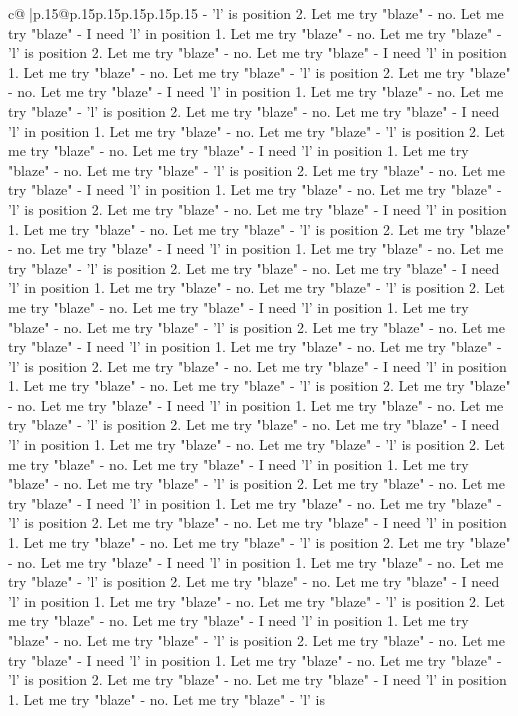 \documentclass{article}
\begin{document}
{\begin{supertabular}{c@{$\;$}|p{.15\linewidth}@{}p{.15\linewidth}p{.15\linewidth}p{.15\linewidth}p{.15\linewidth}p{.15\linewidth}}
{{{{-} 'l' is position 2. Let me try "blaze" {-} no. Let me try "blaze" {-} I need 'l' in position 1. Let me try "blaze" {-} no. Let me try "blaze" {-} 'l' is position 2. Let me try "blaze" {-} no. Let me try "blaze" {-} I need 'l' in position 1. Let me try "blaze" {-} no. Let me try "blaze" {-} 'l' is position 2. Let me try "blaze" {-} no. Let me try "blaze" {-} I need 'l' in position 1. Let me try "blaze" {-} no. Let me try "blaze" {-} 'l' is position 2. Let me try "blaze" {-} no. Let me try "blaze" {-} I need 'l' in position 1. Let me try "blaze" {-} no. Let me try "blaze" {-} 'l' is position 2. Let me try "blaze" {-} no. Let me try "blaze" {-} I need 'l' in position 1. Let me try "blaze" {-} no. Let me try "blaze" {-} 'l' is position 2. Let me try "blaze" {-} no. Let me try "blaze" {-} I need 'l' in position 1. Let me try "blaze" {-} no. Let me try "blaze" {-} 'l' is position 2. Let me try "blaze" {-} no. Let me try "blaze" {-} I need 'l' in position 1. Let me try "blaze" {-} no. Let me try "blaze" {-} 'l' is position 2. Let me try "blaze" {-} no. Let me try "blaze" {-} I need 'l' in position 1. Let me try "blaze" {-} no. Let me try "blaze" {-} 'l' is position 2. Let me try "blaze" {-} no. Let me try "blaze" {-} I need 'l' in position 1. Let me try "blaze" {-} no. Let me try "blaze" {-} 'l' is position 2. Let me try "blaze" {-} no. Let me try "blaze" {-} I need 'l' in position 1. Let me try "blaze" {-} no. Let me try "blaze" {-} 'l' is position 2. Let me try "blaze" {-} no. Let me try "blaze" {-} I need 'l' in position 1. Let me try "blaze" {-} no. Let me try "blaze" {-} 'l' is position 2. Let me try "blaze" {-} no. Let me try "blaze" {-} I need 'l' in position 1. Let me try "blaze" {-} no. Let me try "blaze" {-} 'l' is position 2. Let me try "blaze" {-} no. Let me try "blaze" {-} I need 'l' in position 1. Let me try "blaze" {-} no. Let me try "blaze" {-} 'l' is position 2. Let me try "blaze" {-} no. Let me try "blaze" {-} I need 'l' in position 1. Let me try "blaze" {-} no. Let me try "blaze" {-} 'l' is position 2. Let me try "blaze" {-} no. Let me try "blaze" {-} I need 'l' in position 1. Let me try "blaze" {-} no. Let me try "blaze" {-} 'l' is position 2. Let me try "blaze" {-} no. Let me try "blaze" {-} I need 'l' in position 1. Let me try "blaze" {-} no. Let me try "blaze" {-} 'l' is position 2. Let me try "blaze" {-} no. Let me try "blaze" {-} I need 'l' in position 1. Let me try "blaze" {-} no. Let me try "blaze" {-} 'l' is position 2. Let me try "blaze" {-} no. Let me try "blaze" {-} I need 'l' in position 1. Let me try "blaze" {-} no. Let me try "blaze" {-} 'l' is position 2. Let me try "blaze" {-} no. Let me try "blaze" {-} I need 'l' in position 1. Let me try "blaze" {-} no. Let me try "blaze" {-} 'l' is position 2. Let me try "blaze" {-} no. Let me try "blaze" {-} I need 'l' in position 1. Let me try "blaze" {-} no. Let me try "blaze" {-} 'l' is position 2. Let me try "blaze" {-} no. Let me try "blaze" {-} I need 'l' in position 1. Let me try "blaze" {-} no. Let me try "blaze" {-} 'l' is position 2. Let me try "blaze" {-} no. Let me try "blaze" {-} I need 'l' in position 1. Let me try "blaze" {-} no. Let me try "blaze" {-} 'l' is }}}
\end{supertabular}}
\end{document}
